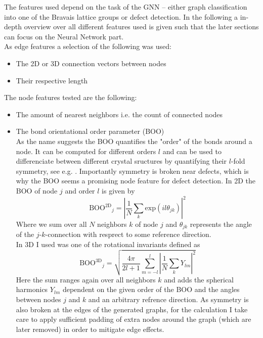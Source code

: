 \documentclass[11pt,a4paper]{article}
\begin{document}
The features used depend on the task of the GNN -- either graph classification into one of the Bravais lattice groups or defect detection. 
In the following a in-depth overview over all different features used is given such that the later sections can focus on the Neural Network part. \\
As edge features a selection of the following was used: 
\begin{itemize}
    \item The 2D or 3D connection vectors between nodes
    \item Their respective length
\end{itemize}
The node features tested are the following:
\begin{itemize}
    \item The amount of nearest neighbors i.e. the count of connected nodes
    \item The bond orientational order parameter (BOO)\\
    As the name suggests the BOO quantifies the "order" of the bonds around a node. 
    It can be computed for different orders $l$ and can be used to differenciate between different crystal sructures by quantifying their $l$-fold symmetry, see e.g. \cite{steinhardtBondorientationalOrderLiquids1983}. 
    Importantly symmetry is broken near defects, which is why the BOO seems a promising node feature for defect detection. 
    In 2D the BOO of node $j$ and order $l$ is given by
    \begin{equation}
        \mathrm{BOO^{2D}}_j = \left|\frac{1}{N} \sum_k \mathrm{exp}(il\theta_{jk}) \right|^2
    \end{equation}
    Where we sum over all $N$ neighbors $k$ of node $j$ and $\theta_{jk}$ represents the angle of the $j$-$k$-connection with resprect to some reference direction. \\
    In 3D I used was one of the rotational invariants defined as 
    \begin{equation}
        \mathrm{BOO^{3D}}_j = \sqrt{\frac{4\pi}{2l+1} \sum_{m=-l}^{l} \left| \frac{1}{N} \sum_k Y_{lm}\right|^2}
    \end{equation} 
    Here the sum ranges again over all neighbors $k$ and adds the spherical harmonics $Y_{lm}$ dependent on the given order of the BOO and the angles between nodes $j$ and $k$ and an arbitrary refrence direction. 
    As symmetry is also broken at the edges of the generated graphs, for the calculation I take care to apply sufficient padding of extra nodes around the graph (which are later removed) in order to mitigate edge effects. 
\end{itemize}
\end{document}
